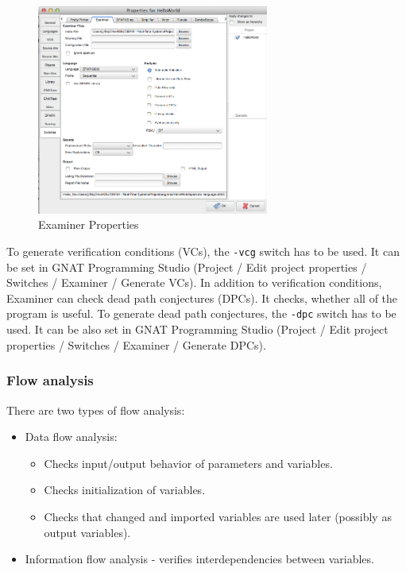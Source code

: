 \begin{figure}[ht]%
    \begin{center}
    	\includegraphics[width=3in]{figures/Properties-Switches-Examiner.png}
    	\caption{Examiner Properties}
    \end{center}
    \label{figure:examinerproperties}
\end{figure}

To generate verification conditions (VCs), the \lstinline{-vcg} switch has to be used. It can be set in GNAT Programming Studio (Project / Edit project properties / Switches / Examiner / Generate VCs).
In addition to verification conditions, Examiner can check dead path conjectures (DPCs). It checks, whether all of the program is useful. To generate dead path conjectures, the \lstinline{-dpc} switch has to be used. It can be also set in GNAT Programming Studio (Project / Edit project properties / Switches / Examiner / Generate DPCs).


\subsubsection{Flow analysis}
\label{verification:examiner:flowanalysis}
There are two types of flow analysis:
\begin{itemize}
	\item Data flow analysis:
	\begin{itemize}
		\item Checks input/output behavior of parameters and variables.
		\item Checks initialization of variables.
		\item Checks that changed and imported variables are used later (possibly as output variables).
	\end{itemize}
	\item Information flow analysis - verifies interdependencies between variables.
\end{itemize}

